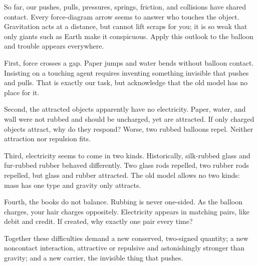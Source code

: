 \begin{mainline}
So far, our pushes, pulls, pressures, springs, friction, and collisions have shared contact. Every force-diagram arrow seems to answer who touches the object. Gravitation acts at a distance, but cannot lift scraps for you; it is so weak that only giants such as Earth make it conspicuous. Apply this outlook to the balloon and trouble appears everywhere.

First, force crosses a gap. Paper jumps and water bends without balloon contact. Insisting on a touching agent requires inventing something invisible that pushes and pulls. That is exactly our task, but acknowledge that the old model has no place for it.

Second, the attracted objects apparently have no electricity. Paper, water, and wall were not rubbed and should be uncharged, yet are attracted. If only charged objects attract, why do they respond? Worse, two rubbed balloons repel. Neither attraction nor repulsion fits.

Third, electricity seems to come in two kinds. Historically, silk-rubbed glass and fur-rubbed rubber behaved differently. Two glass rods repelled, two rubber rods repelled, but glass and rubber attracted. The old model allows no two kinds: mass has one type and gravity only attracts.

Fourth, the books do not balance. Rubbing is never one-sided. As the balloon charges, your hair charges oppositely. Electricity appears in matching pairs, like debit and credit. If created, why exactly one pair every time?

Together these difficulties demand a new conserved, two-signed quantity; a new noncontact interaction, attractive or repulsive and astonishingly stronger than gravity; and a new carrier, the invisible thing that pushes.
\end{mainline}


